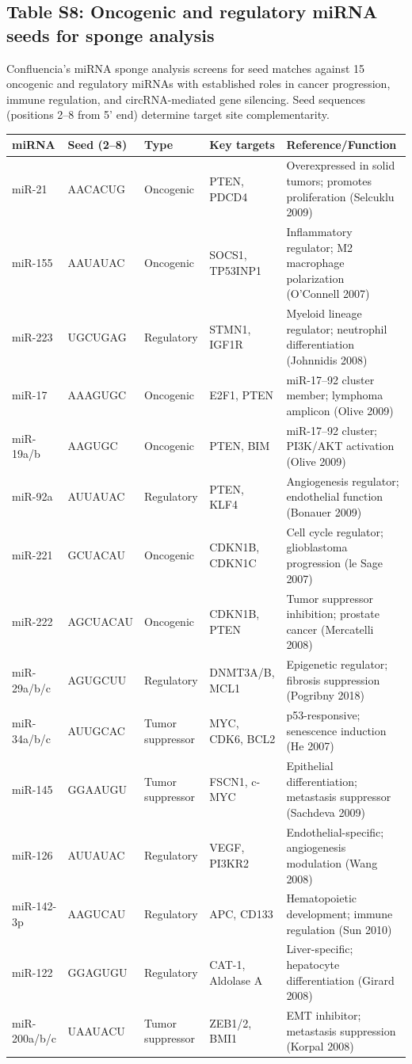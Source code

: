 \subsection*{Table S8: Oncogenic and regulatory miRNA seeds for sponge analysis}

\small Confluencia's miRNA sponge analysis screens for seed matches against 15 oncogenic and regulatory miRNAs with established roles in cancer progression, immune regulation, and circRNA-mediated gene silencing. Seed sequences (positions 2--8 from 5' end) determine target site complementarity.

\begin{tabular}{llllp{5.5cm}}
\toprule
\textbf{miRNA} & \textbf{Seed (2--8)} & \textbf{Type} & \textbf{Key targets} & \textbf{Reference/Function} \\
\midrule
miR-21 & AACACUG & Oncogenic & PTEN, PDCD4 & Overexpressed in solid tumors; promotes proliferation (Selcuklu 2009) \\
miR-155 & AAUAUAC & Oncogenic & SOCS1, TP53INP1 & Inflammatory regulator; M2 macrophage polarization (O'Connell 2007) \\
miR-223 & UGCUGAG & Regulatory & STMN1, IGF1R & Myeloid lineage regulator; neutrophil differentiation (Johnnidis 2008) \\
miR-17 & AAAGUGC & Oncogenic & E2F1, PTEN & miR-17--92 cluster member; lymphoma amplicon (Olive 2009) \\
miR-19a/b & AAGUGC & Oncogenic & PTEN, BIM & miR-17--92 cluster; PI3K/AKT activation (Olive 2009) \\
miR-92a & AUUAUAC & Regulatory & PTEN, KLF4 & Angiogenesis regulator; endothelial function (Bonauer 2009) \\
miR-221 & GCUACAU & Oncogenic & CDKN1B, CDKN1C & Cell cycle regulator; glioblastoma progression (le Sage 2007) \\
miR-222 & AGCUACAU & Oncogenic & CDKN1B, PTEN & Tumor suppressor inhibition; prostate cancer (Mercatelli 2008) \\
miR-29a/b/c & AGUGCUU & Regulatory & DNMT3A/B, MCL1 & Epigenetic regulator; fibrosis suppression (Pogribny 2018) \\
miR-34a/b/c & AUUGCAC & Tumor suppressor & MYC, CDK6, BCL2 & p53-responsive; senescence induction (He 2007) \\
miR-145 & GGAAUGU & Tumor suppressor & FSCN1, c-MYC & Epithelial differentiation; metastasis suppressor (Sachdeva 2009) \\
miR-126 & AUUAUAC & Regulatory & VEGF, PI3KR2 & Endothelial-specific; angiogenesis modulation (Wang 2008) \\
miR-142-3p & AAGUCAU & Regulatory & APC, CD133 & Hematopoietic development; immune regulation (Sun 2010) \\
miR-122 & GGAGUGU & Regulatory & CAT-1, Aldolase A & Liver-specific; hepatocyte differentiation (Girard 2008) \\
miR-200a/b/c & UAAUACU & Tumor suppressor & ZEB1/2, BMI1 & EMT inhibitor; metastasis suppression (Korpal 2008) \\
\bottomrule
\end{tabular}

